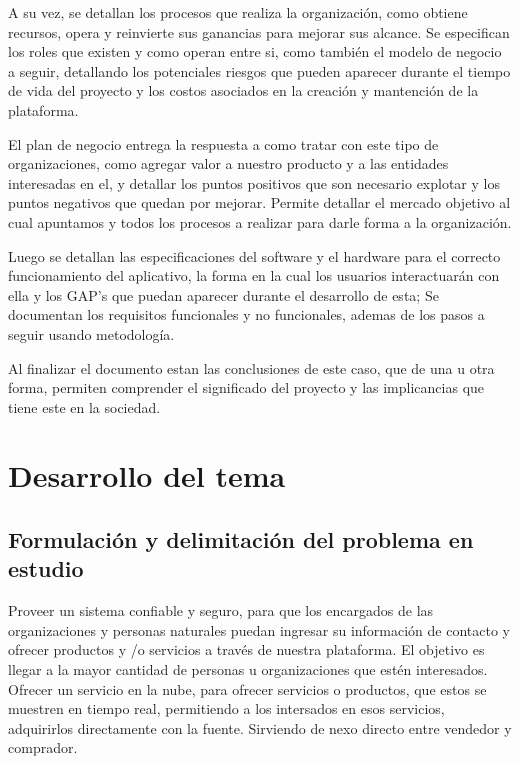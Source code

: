 \documentclass[letterpaper,openright,10pt,twoside]{report}
\begin{document}
	A su vez, se detallan los procesos que realiza la organización, como obtiene recursos, opera y reinvierte sus ganancias para mejorar sus alcance. Se especifican los roles que existen y como operan entre si, como también el modelo de negocio a seguir, detallando los potenciales riesgos que pueden aparecer durante el tiempo de vida del proyecto y los costos asociados en la creación y mantención de la plataforma.
	
	El plan de negocio entrega la respuesta a como tratar con este tipo de organizaciones, como agregar valor a nuestro producto y a las entidades interesadas en el, y detallar los puntos positivos que son necesario explotar y los puntos negativos que quedan por mejorar. Permite detallar el mercado objetivo al cual apuntamos y todos los procesos a realizar para darle forma a la organización.
	
	Luego se detallan las especificaciones del software y el hardware para el correcto funcionamiento del aplicativo, la forma en la cual los usuarios interactuarán con ella y los GAP's que puedan aparecer durante el desarrollo de esta; Se documentan los requisitos funcionales y no funcionales, ademas de los pasos a seguir usando metodología.
	
	Al finalizar el documento estan las conclusiones de este caso, que de una u otra forma, permiten comprender el significado del proyecto y las implicancias que tiene este en la sociedad.


\newpage
\tableofcontents
	
	
\part{Desarrollo del tema}
	\chapter{Formulación y delimitación del problema en estudio}
	Proveer un sistema confiable y seguro, para que los encargados de las organizaciones y personas naturales puedan ingresar su información de contacto y ofrecer productos y /o servicios a través de nuestra plataforma. El objetivo es llegar a la mayor cantidad de personas u organizaciones que estén interesados.
		Ofrecer un servicio en la nube, para ofrecer servicios o productos, que estos se muestren en tiempo real, permitiendo a los intersados en esos servicios, adquirirlos directamente con la fuente. Sirviendo de nexo directo entre vendedor y comprador.
\end{document}
